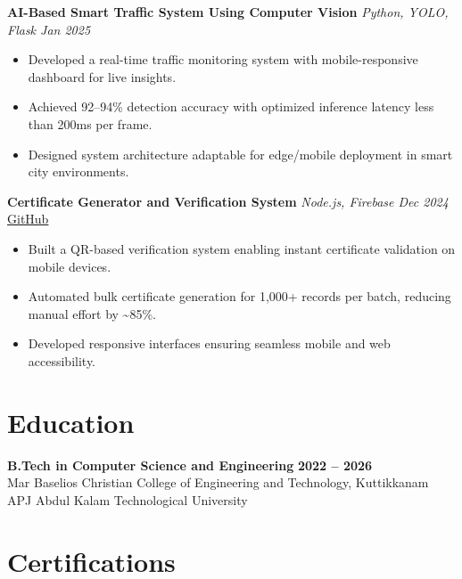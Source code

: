 \documentclass[10pt, a4paper]{article}
\begin{document}
\vspace{3pt}

\textbf{AI-Based Smart Traffic System Using Computer Vision} \hfill \textit{Python, YOLO, Flask \quad Jan 2025}
\begin{itemize}
\item Developed a real-time traffic monitoring system with mobile-responsive dashboard for live insights.
\item Achieved 92--94\% detection accuracy with optimized inference latency less than 200ms per frame.
\item Designed system architecture adaptable for edge/mobile deployment in smart city environments.
\end{itemize}

\vspace{3pt}

\textbf{Certificate Generator and Verification System} \hfill \textit{Node.js, Firebase \quad Dec 2024} \quad \href{https://github.com/bbinxx/advanced-certificate-generator}{GitHub}
\begin{itemize}
\item Built a QR-based verification system enabling instant certificate validation on mobile devices.
\item Automated bulk certificate generation for 1,000+ records per batch, reducing manual effort by \textasciitilde{}85\%.
\item Developed responsive interfaces ensuring seamless mobile and web accessibility.
\end{itemize}

\section*{Education}

\textbf{B.Tech in Computer Science and Engineering} \hfill \textbf{2022 -- 2026}\\
Mar Baselios Christian College of Engineering and Technology, Kuttikkanam \hfill APJ Abdul Kalam Technological University

\section*{Certifications}
\end{document}
